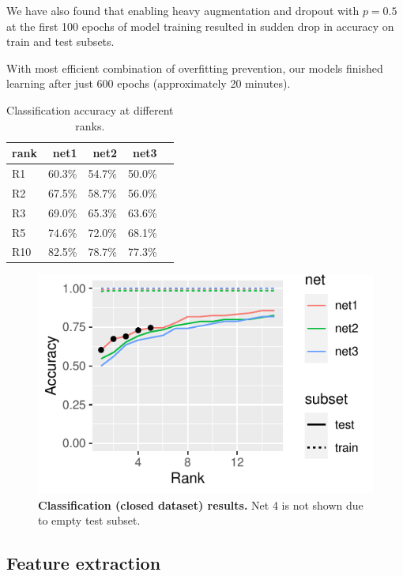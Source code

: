 \documentclass[fleqn,moreauthors,10pt]{ds_report}
\begin{document}
We have also found that enabling heavy augmentation and dropout with $p = 0.5$ at the first 100 epochs of model training resulted in sudden drop in accuracy on train and test subsets.

With most efficient combination of overfitting prevention, our models finished learning after just 600 epochs (approximately 20 minutes).

\begin{table}[hbt]
	\caption{Classification accuracy at different ranks.}
	\centering
	\begin{tabular}{l r r r r}
		\toprule
		rank & net1     & net2     & net3    \\
		\midrule
		R1   & 60.3\%  & 54.7\%  & 50.0\% \\
		R2   & 67.5\%  & 58.7\%  & 56.0\% \\
		R3   & 69.0\%  & 65.3\%  & 63.6\% \\
		R5   & 74.6\%  & 72.0\%  & 68.1\% \\
		R10  & 82.5\%  & 78.7\%  & 77.3\% \\
		\bottomrule
	\end{tabular}
	\label{tab:classification-results}
\end{table}

\begin{figure}[htb]\centering
	\includegraphics[width=0.9\linewidth]{ranks-classification.pdf}
	\caption{\textbf{Classification (closed dataset) results.} Net 4 is not shown due to empty test subset.}
	\label{fig:classification-results}
\end{figure}

\newpage
\subsection*{Feature extraction}
\end{document}
